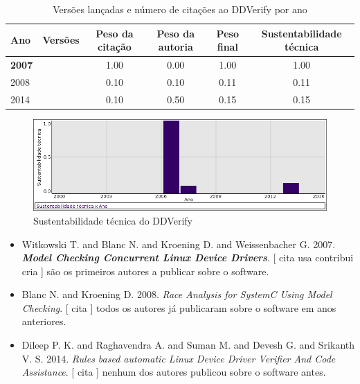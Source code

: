 \begin{table}[H]
\caption{Versões lançadas e número de citações ao DDVerify por ano}
\centering
\begin{tabular}{| l | c | c | c | c | c |}
  \hline
  Ano & Versões & Peso da citação & Peso da autoria & Peso final & Sustentabilidade técnica \\
  \hline
            {\bf 2007}
          &
          
          &
          1.00
          &
          0.00
          &
          1.00
          &
            {\color{blue} 1.00}
          \\
\hline
            2008
          &
          
          &
          0.10
          &
          0.10
          &
          0.11
          &
            {\color{red} 0.11}
          \\
\hline
            2014
          &
          
          &
          0.10
          &
          0.50
          &
          0.15
          &
            {\color{red} 0.15}
          \\
\hline
\end{tabular}
\end{table}

\begin{figure}[h]
  \center
  \includegraphics[scale=0.50]{imagens/softwares-charts/ddverify.png}
  \caption{Sustentabilidade técnica do DDVerify}
\end{figure}


\begin{itemize}
\item Witkowski T. and Blanc N. and Kroening D. and Weissenbacher G.
      2007.
        \textbf{\textit{ Model Checking Concurrent Linux Device Drivers}}.
      [
          cita
          usa
          contribui
          cria
      ]
são os primeiros autores a publicar sobre o software.
\item Blanc N. and Kroening D.
      2008.
        \textit{ Race Analysis for SystemC Using Model Checking}.
      [
          cita
      ]
todos os autores já publicaram sobre o software em anos anteriores.
\item Dileep P. K. and Raghavendra A. and Suman M. and Devesh G. and Srikanth V. S.
      2014.
        \textit{ Rules based automatic Linux Device Driver Verifier And Code Assistance}.
      [
          cita
      ]
nenhum dos autores publicou sobre o software antes.
\end{itemize}
